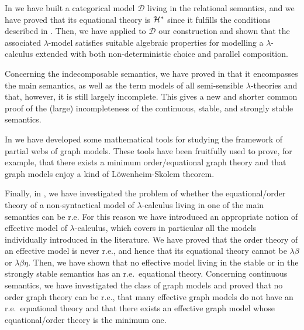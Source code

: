 \documentclass[english]{llncs}
\newcommand{\ro}[1]{\mathscr{#1}} \newcommand{\App}{\mathcal{A}}
\newcommand{\cH}{{\cal H}}
\begin{document}
In \cite[Chapter~3]{ManzonettoTh} we have built a categorical model $\ro{D}$ living in the relational semantics,
and we have proved that its equational theory is $\cH^*$ since it fulfills the conditions described in \cite[Chapter~2]{ManzonettoTh}.
Then, we have applied to $\ro{D}$ our construction and shown that the associated $\lambda$-model satisfies suitable algebraic properties for modelling a $\lambda$-calculus
extended with both non-deterministic choice and parallel composition.

Concerning the indecomposable semantics, we have proved in \cite[Chapter~4]{ManzonettoTh} that it encompasses the main semantics, as well as the term models of all 
semi-sensible $\lambda$-theories and that, however, it is still largely incomplete.
This gives a new and shorter common proof of the (large) incompleteness of the continuous, stable, and strongly stable semantics.

In \cite[Chapter~5]{ManzonettoTh} we have developed some mathematical tools for studying the framework of partial webs of graph models. 
These tools have been fruitfully used to prove, for example, that there exists a minimum order/equational graph theory and that graph models enjoy a kind of 
L\"owenheim-Skolem theorem.

Finally, in \cite[Chapter~6]{ManzonettoTh}, we have investigated the problem of whether the equational/order theory of a non-syntactical model 
of $\lambda$-calculus living in one of the main semantics can be r.e.
For this reason we have introduced an appropriate notion of effective model of $\lambda$-calculus, which covers in particular all the models individually 
introduced in the literature.
We have proved that the order theory of an effective model is never r.e., and hence that its equational theory cannot be $\lambda\beta$ or $\lambda\beta\eta$.
Then, we have shown that no effective model living in the stable or in the strongly stable semantics has an r.e.\ equational theory.
Concerning continuous semantics, we have investigated the class of graph models and proved that no order graph theory can be r.e., 
that many effective graph models do not have an r.e.\ equational theory and that there exists an effective graph model whose equational/order theory is the minimum one.




\end{document}
